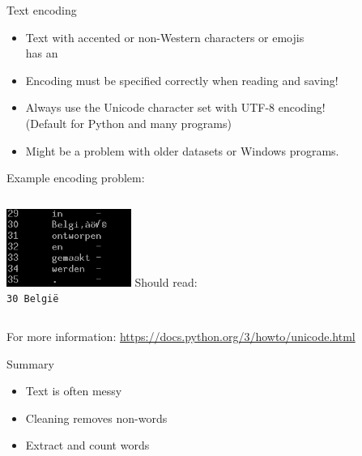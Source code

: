 \documentclass[aspectratio=169,usenames,dvipsnames]{beamer}
\begin{document}
\begin{frame}{Text encoding}
	\begin{itemize}
		\item Text with accented or non-Western characters or emojis \\
            has an 
        \item Encoding must be specified correctly when reading and saving!
        \item Always use the Unicode character set with UTF-8 encoding! \\
            (Default for Python and many programs)
        \item Might be a problem with older datasets or Windows programs.
	\end{itemize}
  
    Example encoding problem:

    \begin{columns}
    \centering
         \includegraphics[width=0.5\textwidth]{fig/encodingissue}
        Should read:\\
        \texttt{30   Belgi\"e}
        \vspace{3em}
    \end{columns}

    \vspace{1em}
    For more information: \url{https://docs.python.org/3/howto/unicode.html}
\end{frame}

\begin{frame}{Summary}
    \begin{itemize}
        \item Text is often messy
        \item Cleaning removes non-words
        \item Extract and count words
    \end{itemize}
\end{frame}

\end{document}
